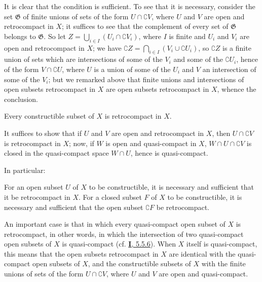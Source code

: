 It is clear that the condition is sufficient. To see that it is
necessary, consider the set $\mathfrak{G}$ of finite unions
of sets of the form $U\cap\complement{V}$, where $U$ and $V$ are open and
retrocompact in $X$; it suffices to see that the complement of every
set of $\mathfrak{G}$ belongs to $\mathfrak{G}$. So let
$Z=\bigcup_{i\in I}(U_i\cap\complement{V_i})$, where $I$ is finite and $U_i$
and $V_i$ are open and retrocompact in $X$; we have
$\complement{Z}=\bigcap_{i\in I}(V_i\cup\complement{U_i})$, so
$\complement{Z}$ is a finite union of sets which are intersections of
some of the $V_i$ and some of the $\complement{U_i}$, hence
of the form
$V\cap\complement{U}$, where $U$ is a union of some of the $U_i$ and
$V$ an intersection of some of the $V_i$; but we remarked
above that finite unions and intersections of open subsets retrocompact
in $X$ are open subsets retrocompact in $X$, whence the conclusion.

\begin{corollary}[9.1.4]
\label{0.9.1.4}
Every constructible subset of $X$ is retrocompact in $X$.
\end{corollary}

It suffices to show that if $U$ and $V$ are open and retrocompact in $X$,
then $U\cap\complement{V}$ is retrocompact in $X$; now, if $W$ is open and
quasi-compact in $X$, $W\cap U\cap\complement{V}$ is closed in the
quasi-compact space $W\cap U$, hence is quasi-compact.

In particular:

\begin{corollary}[9.1.5]
\label{0.9.1.5}
For an open subset $U$ of $X$ to be constructible, it is necessary and
sufficient that it be retrocompact in $X$. For a closed subset $F$ of
$X$ to be constructible, it is necessary and sufficient that the open subset
$\complement{F}$ be retrocompact.
\end{corollary}

\begin{env}[9.1.6]
\label{0.9.1.6}
An important case is that in which every quasi-compact open subset of $X$
is retrocompact, in other words, in which the intersection of two
quasi-compact open subsets of $X$ is quasi-compact
(cf. \hyperref[I.5.5.6]{\textbf{I}, 5.5.6}). When $X$ itself is
quasi-compact, this means that the open subsets retrocompact in
$X$ are identical with the quasi-compact open subsets of $X$, and the
constructible subsets of $X$ with the finite unions of sets of the form
$U\cap\complement{V}$, where $U$ and $V$ are open and quasi-compact.
\end{env}

